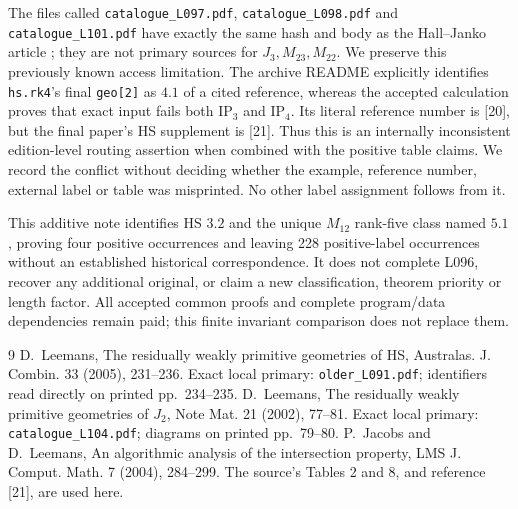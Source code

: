 \documentclass[11pt,a4paper]{article}
\begin{document}
The files called \texttt{catalogue\_L097.pdf},
\texttt{catalogue\_L098.pdf} and \texttt{catalogue\_L101.pdf} have exactly
the same hash and body as the Hall--Janko article \cite{J2}; they are not
primary sources for $J_3,M_{23},M_{22}$. We preserve this previously known
access limitation. The archive README explicitly identifies \texttt{hs.rk4}'s final
\texttt{geo[2]} as $4.1$ of a cited reference, whereas the accepted
calculation proves that exact input fails both $\mathrm{IP}_3$ and
$\mathrm{IP}_4$. Its literal reference number is [20], but the final
paper's HS supplement is [21]. Thus this is an internally inconsistent
edition-level routing assertion when combined with the positive table
claims. We record the conflict without deciding whether the example,
reference number, external label or table was misprinted. No other
label assignment follows from it.

This additive note identifies HS $3.2$ and the unique $M_{12}$ rank-five
class named $5.1$, proving four positive occurrences and leaving 228
positive-label occurrences without an established historical correspondence. It does not complete L096,
recover any additional original, or claim a new classification, theorem
priority or length factor. All accepted common proofs and complete
program/data dependencies remain paid; this finite invariant comparison
does not replace them.

\begin{thebibliography}{9}
 D.~Leemans, The residually weakly primitive geometries of HS,
Australas. J. Combin. 33 (2005), 231--236. Exact local primary:
\texttt{older\_L091.pdf}; identifiers read directly on printed pp.~234--235.
 D.~Leemans, The residually weakly primitive geometries of $J_2$,
Note Mat. 21 (2002), 77--81. Exact local primary:
\texttt{catalogue\_L104.pdf}; diagrams on printed pp.~79--80.
 P.~Jacobs and D.~Leemans, An algorithmic analysis of the
intersection property, LMS J. Comput. Math. 7 (2004), 284--299.
The source's Tables 2 and 8, and reference [21], are used here.
\end{thebibliography}
\end{document}
